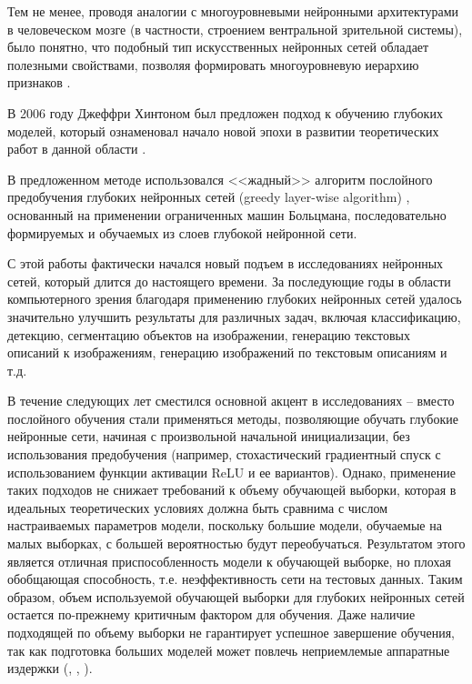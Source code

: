 Тем не менее, проводя аналогии с многоуровневыми нейронными архитектурами в человеческом мозге (в частности, строением вентральной зрительной системы), было понятно, что подобный тип искусственных нейронных сетей обладает полезными свойствами, позволяя формировать многоуровневую иерархию признаков \cite{Behnke2003}.

В 2006 году Джеффри Хинтоном был предложен подход к обучению глубоких моделей, который ознаменовал начало новой эпохи в развитии теоретических работ в данной области \cite{n1}.

В предложенном методе использовался <<жадный>> алгоритм послойного предобучения глубоких нейронных сетей (greedy layer-wise algorithm) \cite{Hinton2009}, основанный на применении ограниченных машин Больцмана, последовательно формируемых и обучаемых из слоев глубокой нейронной сети. 

С этой работы фактически начался новый подъем в исследованиях нейронных сетей, который длится до настоящего времени. За последующие годы в области компьютерного зрения благодаря применению глубоких нейронных сетей удалось значительно улучшить результаты для различных задач, включая классификацию, детекцию, сегментацию объектов на изображении, генерацию текстовых описаний к изображениям, генерацию изображений по текстовым описаниям и т.д.  %

В течение следующих лет сместился основной акцент в исследованиях -- вместо послойного обучения стали применяться методы, позволяющие обучать глубокие нейронные сети, начиная с произвольной начальной инициализации, без использования предобучения (например, стохастический градиентный спуск с использованием функции активации ReLU и ее вариантов). Однако, применение таких подходов не снижает требований к объему обучающей выборки, которая в идеальных теоретических условиях должна быть сравнима с числом настраиваемых параметров модели, поскольку большие модели, обучаемые на малых выборках, с большей вероятностью будут переобучаться. Результатом этого является отличная приспособленность модели к обучающей выборке, но плохая обобщающая способность, т.е. неэффективность сети на тестовых данных. Таким образом, объем используемой обучающей выборки для глубоких нейронных сетей остается по-прежнему критичным фактором для обучения. Даже наличие подходящей по объему выборки не гарантирует успешное завершение обучения, так как подготовка больших моделей может повлечь неприемлемые аппаратные издержки (\cite{alpaca2023}, \cite{alpacagithub}, \cite{zhang2022opt}).

